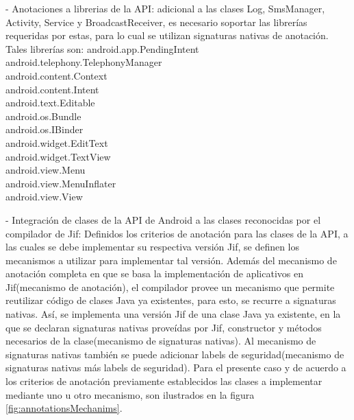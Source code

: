 - Anotaciones a librerias de la API: 
adicional a las clases Log, SmsManager, Activity, Service y
BroadcastReceiver, es necesario soportar las librerías requeridas por estas,
para lo cual se utilizan signaturas nativas de anotación. Tales librerías son:
android.app.PendingIntent\\
android.telephony.TelephonyManager\\
android.content.Context\\
android.content.Intent\\
android.text.Editable\\
android.os.Bundle\\
android.os.IBinder\\
android.widget.EditText\\
android.widget.TextView\\ 
android.view.Menu\\
android.view.MenuInflater\\
android.view.View 

% 
- Integración de clases de la API de Android a las clases reconocidas por el
compilador de Jif:\newline
Definidos los criterios de anotación para las clases de la API, a las cuales se
debe implementar su respectiva versión Jif, se definen los mecanismos a utilizar
para implementar tal versión. Además del mecanismo de anotación completa en que
se basa la implementación de aplicativos en Jif(mecanismo de anotación), el
compilador provee un mecanismo que permite reutilizar código de clases Java ya
existentes, para esto, se recurre a signaturas nativas. Así, se implementa una
versión Jif de una clase Java ya existente, en la que se declaran signaturas
nativas proveídas por Jif, constructor y métodos necesarios de la
clase(mecanismo de signaturas nativas).
Al mecanismo de signaturas nativas también se puede  adicionar labels de
seguridad(mecanismo de signaturas nativas más labels de seguridad).\newline
Para el presente caso y de acuerdo a los criterios de anotación previamente
establecidos las clases a implementar mediante uno u otro mecanismo, son
ilustrados en la figura \ref{fig:annotationsMechanims}.\newline

